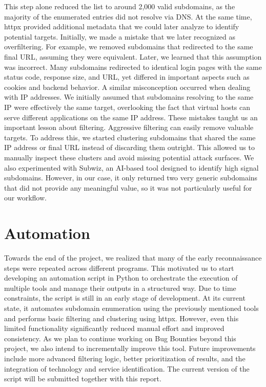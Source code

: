 \documentclass[12pt,a4paper]{report}
\begin{document}
This step alone reduced the list to around 2,000 valid subdomains, as the majority of the enumerated entries did not resolve via DNS. At the same time, httpx provided additional metadata that we could later analyze to identify potential targets.
Initially, we made a mistake that we later recognized as overfiltering. For example, we removed subdomains that redirected to the same final URL, assuming they were equivalent. Later, we learned that this assumption was incorrect. Many subdomains redirected to identical login pages with the same status code, response size, and URL, yet differed in important aspects such as cookies and backend behavior.
A similar misconception occurred when dealing with IP addresses. We initially assumed that subdomains resolving to the same IP were effectively the same target, overlooking the fact that virtual hosts can serve different applications on the same IP address.
These mistakes taught us an important lesson about filtering. Aggressive filtering can easily remove valuable targets. To address this, we started clustering subdomains that shared the same IP address or final URL instead of discarding them outright. This allowed us to manually inspect these clusters and avoid missing potential attack surfaces.
We also experimented with Subwiz, an AI-based tool designed to identify high signal subdomains. However, in our case, it only returned two very generic subdomains that did not provide any meaningful value, so it was not particularly useful for our workflow.

\section{Automation}

Towards the end of the project, we realized that many of the early reconnaissance steps were repeated across different programs. This motivated us to start developing an automation script in Python to orchestrate the execution of multiple tools and manage their outputs in a structured way.
Due to time constraints, the script is still in an early stage of development. At its current state, it automates subdomain enumeration using the previously mentioned tools and performs basic filtering and clustering using httpx. However, even this limited functionality significantly reduced manual effort and improved consistency.
As we plan to continue working on Bug Bounties beyond this project, we also intend to incrementally improve this tool. Future improvements include more advanced filtering logic, better prioritization of results, and the integration of technology and service identification. The current version of the script will be submitted together with this report.
\end{document}
